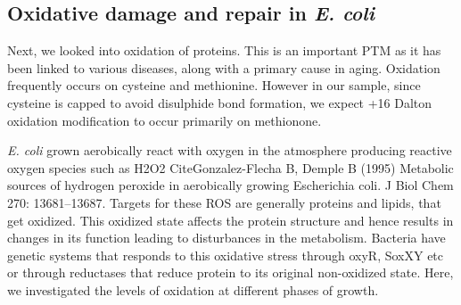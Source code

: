 \documentclass[12pt]{article}
\begin{document}
\subsection{Oxidative damage and repair in \emph{E. coli}}
%
%   
%   
%   
%
Next, we looked into oxidation of proteins. This is an important PTM as it has been linked to various diseases, along with a primary cause in aging. Oxidation frequently occurs on cysteine and methionine. However in our sample, since cysteine is capped to avoid disulphide bond formation, we expect +16 Dalton oxidation modification to occur primarily on methionone. 

\emph{E. coli} grown aerobically react with oxygen in the atmosphere producing reactive oxygen species such as H2O2 {CiteGonzalez-Flecha B, Demple B (1995) Metabolic sources of hydrogen peroxide in aerobically growing Escherichia coli. J Biol Chem 270: 13681–13687}. Targets for these ROS are generally proteins and lipids, that get oxidized. This oxidized state affects the protein structure and hence results in changes in its function leading to disturbances in the metabolism. Bacteria have genetic systems that responds to this oxidative stress through oxyR, SoxXY etc or through reductases that reduce protein to its original non-oxidized state. Here, we investigated the levels of oxidation at different phases of growth.
\end{document}
